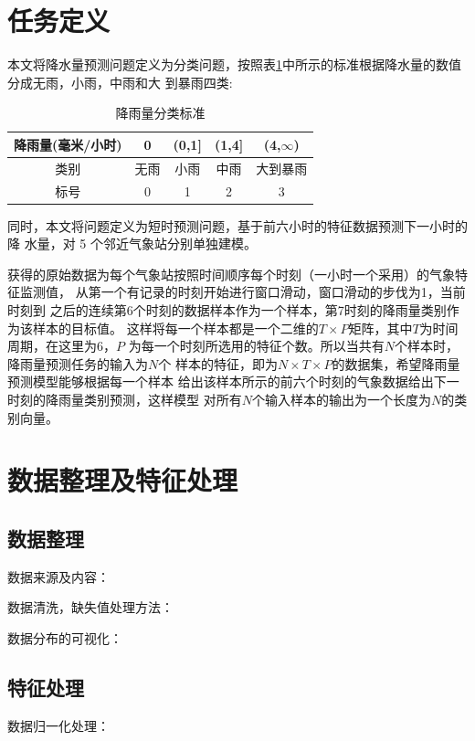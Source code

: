 \documentclass[UTF8]{ctexart}
\begin{document}
\section{任务定义}
本文将降水量预测问题定义为分类问题，按照表\ref{tab:jyl}中所示的标准根据降水量的数值分成无雨，小雨，中雨和大
到暴雨四类: 

\begin{table}[htb]
  \centering
  \begin{minipage}[t]{\linewidth}
  \centering
  \caption{降雨量分类标准}
  \label{tab:jyl}
    \begin{tabular}{ccccc}
      \toprule[1pt]
      降雨量(毫米/小时) & 0 & (0,1] & (1,4] & (4,$\infty$) \\
      \midrule[0.5pt]
      类别 & 无雨 & 小雨 & 中雨 & 大到暴雨\\
      标号 & 0 & 1 & 2 & 3\\
      \bottomrule[1pt]
    \end{tabular}
  \end{minipage}
\end{table}

同时，本文将问题定义为短时预测问题，基于前六小时的特征数据预测下一小时的降
水量，对 5 个邻近气象站分别单独建模。

获得的原始数据为每个气象站按照时间顺序每个时刻（一小时一个采用）的气象特征监测值，
从第一个有记录的时刻开始进行窗口滑动，窗口滑动的步伐为1，当前时刻到
之后的连续第6个时刻的数据样本作为一个样本，第7时刻的降雨量类别作为该样本的目标值。
这样将每一个样本都是一个二维的$T\times P$矩阵，其中$T$为时间周期，在这里为6，$P$
为每一个时刻所选用的特征个数。所以当共有$N$个样本时，降雨量预测任务的输入为$N$个
样本的特征，即为$N\times T\times P$的数据集，希望降雨量预测模型能够根据每一个样本
给出该样本所示的前六个时刻的气象数据给出下一时刻的降雨量类别预测，这样模型
对所有$N$个输入样本的输出为一个长度为$N$的类别向量。

\section{数据整理及特征处理}
\subsection{数据整理}
数据来源及内容：

数据清洗，缺失值处理方法：

数据分布的可视化：

\subsection{特征处理}
数据归一化处理：
\end{document}
